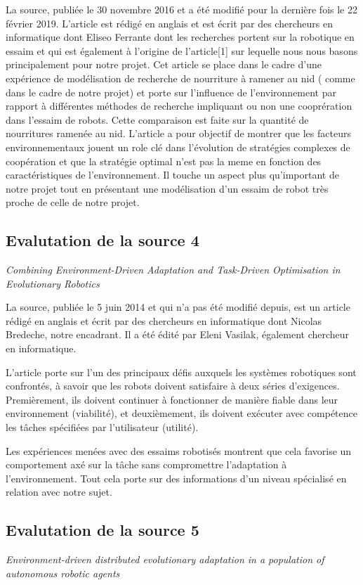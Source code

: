 \documentclass[11pt]{article}
\begin{document}
\begin{flushleft}
 La source, publiée le 30 novembre 2016 et a été modifié pour la dernière fois le 22 février 2019. L'article est rédigé en anglais et est écrit par des chercheurs en informatique dont Eliseo Ferrante dont les recherches portent sur la robotique en essaim et qui est également à l'origine de l'article[1] sur lequelle nous nous basons principalement pour notre projet. Cet article se place dans le cadre d'une expérience de modélisation de recherche de nourriture à ramener au nid ( comme dans le cadre de notre projet) et porte sur l'influence de l'environnement par rapport à différentes méthodes de recherche impliquant ou non une cooprération dans l'essaim de robots. Cette comparaison est faite sur la quantité de nourritures ramenée au nid. L'article a pour objectif de montrer que les facteurs environnementaux jouent un role clé dans l'évolution de stratégies complexes de coopération et que la stratégie optimal n'est pas la meme en fonction des caractéristiques de l'environnement. Il touche un aspect plus qu'important de notre projet tout en présentant une modélisation d'un essaim de robot très proche de celle de notre projet.

\subsection{Evalutation de la source 4}
\textit{Combining Environment-Driven Adaptation and Task-Driven Optimisation in Evolutionary Robotics}

La source, publiée le 5 juin 2014 et qui n'a pas été modifié depuis, est un article rédigé en anglais et écrit par des chercheurs en informatique dont Nicolas Bredeche, notre encadrant. Il a été édité par Eleni Vasilak, également chercheur en informatique.

L'article porte sur l'un des principaux défis auxquels les systèmes robotiques sont confrontés, à savoir que les robots doivent satisfaire à deux séries d'exigences. Premièrement, ils doivent continuer à fonctionner de manière fiable dans leur environnement (viabilité), et deuxièmement, ils doivent exécuter avec compétence les tâches spécifiées par l'utilisateur (utilité).

Les expériences menées avec des essaims robotisés montrent que cela favorise un comportement axé sur la tâche sans compromettre l'adaptation à l'environnement. Tout cela porte sur des informations d’un niveau spécialisé en relation avec notre sujet.

 \subsection{Evalutation de la source 5}
\textit{Environment-driven distributed evolutionary adaptation in a population of autonomous robotic agents}


\end{flushleft}
\end{document}
